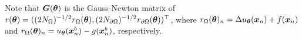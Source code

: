 
Note that ${\bm{G}}({\bm{\theta}})$ is the Gauss-Newton matrix of $r({\bm{\theta}}) = ((2N_\Omega)^{-1/2}r_\Omega({\bm{\theta}}), (2N_{\partial\Omega})^{-1/2} r_{\partial\Omega}({\bm{\theta}}))^\top$,
where $r_{\Omega}({\bm{\theta}})_n = \Delta u_{\bm{\theta}}({\bm{x}}_n) + f({\bm{x}}_n)$ and $r_{\Omega}({\bm{\theta}})_n = u_{\bm{\theta}}({\bm{x}}_n^b) - g({\bm{x}}_n^b)$, respectively.

